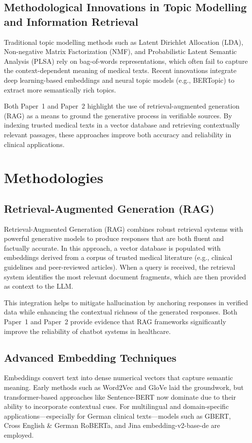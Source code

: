 \subsection{Methodological Innovations in Topic Modelling and Information Retrieval}
Traditional topic modelling methods such as Latent Dirichlet Allocation (LDA), Non-negative Matrix Factorization (NMF), and Probabilistic Latent Semantic Analysis (PLSA) rely on bag-of-words representations, which often fail to capture the context-dependent meaning of medical texts. Recent innovations integrate deep learning-based embeddings and neural topic models (e.g., BERTopic) to extract more semantically rich topics.

Both Paper~1 and Paper~2 highlight the use of retrieval-augmented generation (RAG) as a means to ground the generative process in verifiable sources. By indexing trusted medical texts in a vector database and retrieving contextually relevant passages, these approaches improve both accuracy and reliability in clinical applications.

\section{Methodologies}

\subsection{Retrieval-Augmented Generation (RAG)}
Retrieval-Augmented Generation (RAG) combines robust retrieval systems with powerful generative models to produce responses that are both fluent and factually accurate. In this approach, a vector database is populated with embeddings derived from a corpus of trusted medical literature (e.g., clinical guidelines and peer-reviewed articles). When a query is received, the retrieval system identifies the most relevant document fragments, which are then provided as context to the LLM.

This integration helps to mitigate hallucination by anchoring responses in verified data while enhancing the contextual richness of the generated responses. Both Paper~1 and Paper~2 provide evidence that RAG frameworks significantly improve the reliability of chatbot systems in healthcare.

\subsection{Advanced Embedding Techniques}
Embeddings convert text into dense numerical vectors that capture semantic meaning. Early methods such as Word2Vec and GloVe laid the groundwork, but transformer-based approaches like Sentence-BERT now dominate due to their ability to incorporate contextual cues. For multilingual and domain-specific applications—especially for German clinical texts—models such as GBERT, Cross English \& German RoBERTa, and Jina embedding-v2-base-de are employed.

